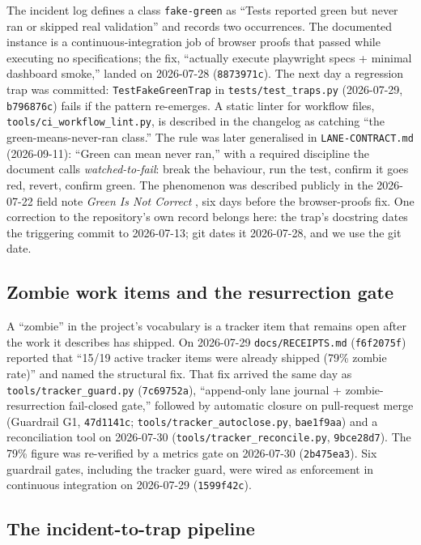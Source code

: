 \documentclass[11pt]{article}
\newcommand{\sha}[1]{\texttt{\small #1}}
\newcommand{\file}[1]{\texttt{\small #1}}
\begin{document}
The incident log defines a class \texttt{fake-green} as ``Tests reported green but never ran or skipped real validation'' and records two occurrences. The documented instance is a continuous-integration job of browser proofs that passed while executing no specifications; the fix, ``actually execute playwright specs + minimal dashboard smoke,'' landed on 2026-07-28 (\sha{8873971c}). The next day a regression trap was committed: \texttt{TestFakeGreenTrap} in \file{tests/test\_traps.py} (2026-07-29, \sha{b796876c}) fails if the pattern re-emerges. A static linter for workflow files, \file{tools/ci\_workflow\_lint.py}, is described in the changelog as catching ``the green-means-never-ran class.'' The rule was later generalised in \file{LANE-CONTRACT.md} (2026-09-11): ``Green can mean never ran,'' with a required discipline the document calls \emph{watched-to-fail}: break the behaviour, run the test, confirm it goes red, revert, confirm green. The phenomenon was described publicly in the 2026-07-22 field note \emph{Green Is Not Correct} \cite{green}, six days before the browser-proofs fix. One correction to the repository's own record belongs here: the trap's docstring dates the triggering commit to 2026-07-13; git dates it 2026-07-28, and we use the git date.

\subsection{Zombie work items and the resurrection gate}

A ``zombie'' in the project's vocabulary is a tracker item that remains open after the work it describes has shipped. On 2026-07-29 \file{docs/RECEIPTS.md} (\sha{f6f2075f}) reported that ``15/19 active tracker items were already shipped (79\% zombie rate)'' and named the structural fix. That fix arrived the same day as \file{tools/tracker\_guard.py} (\sha{7c69752a}), ``append-only lane journal + zombie-resurrection fail-closed gate,'' followed by automatic closure on pull-request merge (Guardrail G1, \sha{47d1141c}; \file{tools/tracker\_autoclose.py}, \sha{bae1f9aa}) and a reconciliation tool on 2026-07-30 (\file{tools/tracker\_reconcile.py}, \sha{9bce28d7}). The 79\% figure was re-verified by a metrics gate on 2026-07-30 (\sha{2b475ea3}). Six guardrail gates, including the tracker guard, were wired as enforcement in continuous integration on 2026-07-29 (\sha{1599f42c}).

\subsection{The incident-to-trap pipeline}
\end{document}
